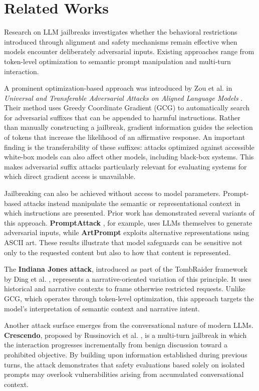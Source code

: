 \documentclass[11pt,a4paper,twocolumn]{article}
\begin{document}
	\section{Related Works}
	
	Research on LLM jailbreaks investigates whether the behavioral restrictions introduced through alignment and safety mechanisms remain effective when models encounter deliberately adversarial inputs.
	Existing approaches range from token-level optimization to semantic prompt manipulation and multi-turn interaction.
	
	A prominent optimization-based approach was introduced by Zou et al. in \textit{Universal and Transferable Adversarial Attacks on Aligned Language Models} \cite{zou2023universaltransferableadversarialattacks}.
	Their method uses Greedy Coordinate Gradient (GCG) to automatically search for adversarial suffixes that can be appended to harmful instructions.
	Rather than manually constructing a jailbreak, gradient information guides the selection of tokens that increase the likelihood of an affirmative response.
	An important finding is the transferability of these suffixes: attacks optimized against accessible white-box models can also affect other models, including black-box systems.
	This makes adversarial suffix attacks particularly relevant for evaluating systems for which direct gradient access is unavailable.
	
	Jailbreaking can also be achieved without access to model parameters.
	Prompt-based attacks instead manipulate the semantic or representational context in which instructions are presented.
	Prior work has demonstrated several variants of this approach.
	\textbf{PromptAttack} \cite{xu2024promptattack}, for example, uses LLMs themselves to generate adversarial inputs, while \textbf{ArtPrompt} \cite{jiang2024artprompt} exploits alternative representations using ASCII art.
	These results illustrate that model safeguards can be sensitive not only to the requested content but also to how that content is represented.
	
	The \textbf{Indiana Jones attack}, introduced as part of the TombRaider framework by Ding et al. \cite{ding2025tombraiderenteringvaulthistory}, represents a narrative-oriented variation of this principle.
	It uses historical and narrative contexts to frame otherwise restricted requests.
	Unlike GCG, which operates through token-level optimization, this approach targets the model's interpretation of semantic context and narrative intent.
	
	Another attack surface emerges from the conversational nature of modern LLMs.
	\textbf{Crescendo}, proposed by Russinovich et al. \cite{russinovich2025greatwritearticlethat}, is a multi-turn jailbreak in which the interaction progresses incrementally from benign discussion toward a prohibited objective.
	By building upon information established during previous turns, the attack demonstrates that safety evaluations based solely on isolated prompts may overlook vulnerabilities arising from accumulated conversational context.
	
\end{document}
